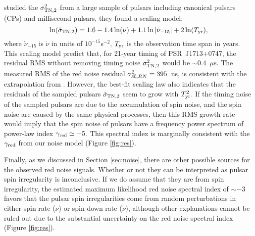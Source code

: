 \citet{sc10} studied the $\sigma^2_{\rm TN,2}$ from a large sample of pulsars
including canonical pulsars (CPs) and millisecond pulsars, they found a scaling
model:
\begin{equation}
\label{eq:sc10}
\ln(\hat{\sigma}_{\rm TN,2}) = 1.6 - 1.4\ln(\nu) +
1.1\ln|\dot{\nu}_{-15}|+2\ln(T_{\rm yr}),
\end{equation}
where $\dot{\nu}_{-15}$ is $\dot{\nu}$ in units of $10^{-15}$s$^{-2}$, $T_{\rm yr}$
is the observation time span in years.
This scaling model predict that, for 21-year timing of PSR~J1713+0747, the
residual RMS without removing timing noise $\sigma^2_{\rm TN,2}$ would be
$\sim0.4$~$\mu $s. The measured RMS of the red noise residual 
$\sigma^2_{\mathscr{R},RN}=395$~ns, is consistent with the extrapolation
from \citet{sc10}.  
However, the best-fit scaling law also indicates that the residuals of the
sampled pulsars $\hat{\sigma}_{\rm TN,2}$ seem to grow with $T_{\rm yr}^2$. 
If the timing noise of the sampled pulsars are due to the accumulation of 
spin noise, and the spin noise are caused by the same physical processes,
then this RMS growth rate would imply that the spin noise of pulsars have a
frequency power spectrum of power-law index $\gamma_{\rm red}\simeq-5$. This 
spectral index is marginally consistent with the $\gamma_{\rm red}$
from our noise model (Figure \ref{fig:res}).

Finally, as we discussed in Section \ref{sec:noise}, there are other possible
sources for the observed red noise signals.
Whether or not they can be interpreted as pulsar spin irregularity is inconclusive.
If we do assume that they are from spin irregularity, 
the estimated maximum likelihood red noise spectral index of $\sim-3$ 
favors that the pulsar spin irregularities come from
random perturbations in either spin rate ($\nu$) or spin-down rate
($\dot{\nu}$), although other explanations cannot be ruled out due to the
substantial uncertainty on the red noise spectral index (Figure \ref{fig:res}).




